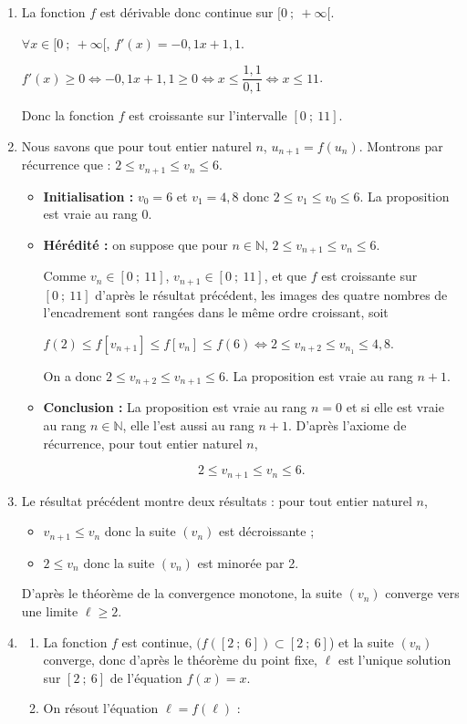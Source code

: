 \documentclass[10pt]{article}
\providecommand{\N}{\mathbb{N}}
\begin{document}
\begin{enumerate}[resume]
	\item La fonction $f$ est dérivable donc continue sur $[0~;~+\infty[$.
	
$\forall x \in [0~;~+\infty[$, $f'(x) = -0,1x + 1,1$.
	
$f'(x)\geqslant 0 \iff -0,1x + 1,1\geqslant 0 \iff x\leqslant \dfrac{1,1}{0,1} \iff x \leqslant 11$.
	
Donc la fonction $f$ est croissante sur l'intervalle $[0~;~11]$.
	\item Nous savons que pour tout entier naturel $n$, $u_{n+1}=f(u_n)$. Montrons par récurrence que : $2 \leqslant v_{n+1} \leqslant v_n \leqslant 6$.
	\begin{itemize}
		\item\textbf{Initialisation :} $v_0 = 6$ et $v_1 = 4,8$ donc $2 \leqslant v_{1} \leqslant v_0 \leqslant 6$. La proposition est vraie au rang $0$.
		\item\textbf{Hérédité :} on suppose que pour $n \in \N$,\: $2 \leqslant v_{n+1} \leqslant v_n \leqslant 6$.

Comme $v_{n}\in [0~;~11]$, $v_{n+1}\in [0~;~11]$, et que $f$ est croissante sur $[0~;~11]$ d'après le résultat précédent, les images des quatre nombres de l'encadrement sont rangées dans le même ordre croissant, soit 

$f(2) \leqslant f[v_{n+1}] \leqslant f[v_{n}] \leqslant f(6) \iff 2 \leqslant v_{n+2} \leqslant v_{n_1} \leqslant 4,8$.

On a donc $2 \leqslant v_{n+2} \leqslant v_{n+1}  \leqslant 6$. La proposition est vraie au rang $n + 1$.
		\item \textbf{Conclusion :} La proposition est vraie au rang $n = 0$ et si elle est vraie au rang $n \in \N$, elle l'est aussi au rang $n + 1$. D'après l'axiome de récurrence, pour tout entier naturel $n$,
	
\[2 \leqslant v_{n+1} \leqslant v_n \leqslant 6.\]
	\end{itemize}
\item Le résultat précédent montre deux résultats : pour tout entier naturel $n$,
\begin{itemize}
	\item $v_{n+1} \leqslant v_n$ donc la suite $(v_n)$ est décroissante ;
	\item $2 \leqslant v_{n}$ donc la suite $(v_n)$ est minorée par 2.
	\end{itemize}
	
D'après le théorème de la convergence monotone, la suite $(v_n)$ converge vers une limite $\ell \geqslant 2$.
	\item \begin{enumerate}
		\item La fonction $f$ est continue,  $(f\left([2~;~6]\right) \subset [2~;~6]$) et la suite $(v_n)$ converge, donc d'après le théorème du point fixe, $\ell$ est l'unique solution sur $[2~;~6]$ de l'équation $f(x) = x$.
		\item On résout l'équation $\ell=f(\ell)$ :
		

\end{enumerate}
\end{enumerate}
\end{document}
